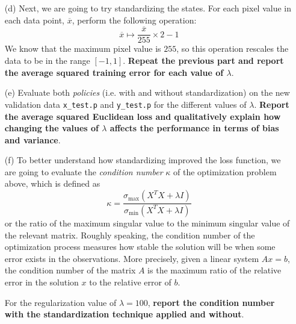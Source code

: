 \documentclass{article}
\begin{document}
\begin{itemize}
        \item [(d)] Next, we are going to try standardizing the states. For each pixel value in each data point, $\overline{x}$, perform the following operation:
            \begin{equation*}
                \overline{x} \mapsto \dfrac{\overline{x}}{255} \times 2 - 1
            \end{equation*}
        We know that the maximum pixel value is $255$, so this operation rescales the data to be in the range $[-1, 1]$. \textbf{Repeat the previous part and report the average squared training error for each value of $\lambda$}.

        \item [(e)] Evaluate both \textit{policies} (i.e. with and without standardization) on the new validation data \texttt{x_test.p} and \texttt{y_test.p} for the different values of $\lambda$. \textbf{Report the average squared Euclidean loss and qualitatively explain how changing the values of $\lambda$ affects the performance in terms of bias and variance}.

        \item [(f)] To better understand how standardizing improved the loss function, we are going to evaluate the \textit{condition number} $\kappa$ of the optimization problem above, which is defined as
            \begin{equation*}
                \kappa = \dfrac{\sigma_{\max}(X^{T}X + \lambda I)}{\sigma_{\min}(X^{T}X + \lambda I)}
            \end{equation*}
        or the ratio of the maximum singular value to the minimum singular value of the relevant matrix. Roughly speaking, the condition number of the optimization process measures how stable the solution will be when some error exists in the observations. More precisely, given a linear system $Ax = b$, the condition number of the matrix $A$ is the maximum ratio of the relative error in the solution $x$ to the relative error of $b$.

        For the regularization value of $\lambda = 100$, \textbf{report the condition number with the standardization technique applied and without}.
    \end{itemize}

\inputminted{python}{\detokenize{./hw2/robotic_ridge_code.py}}
\end{document}
